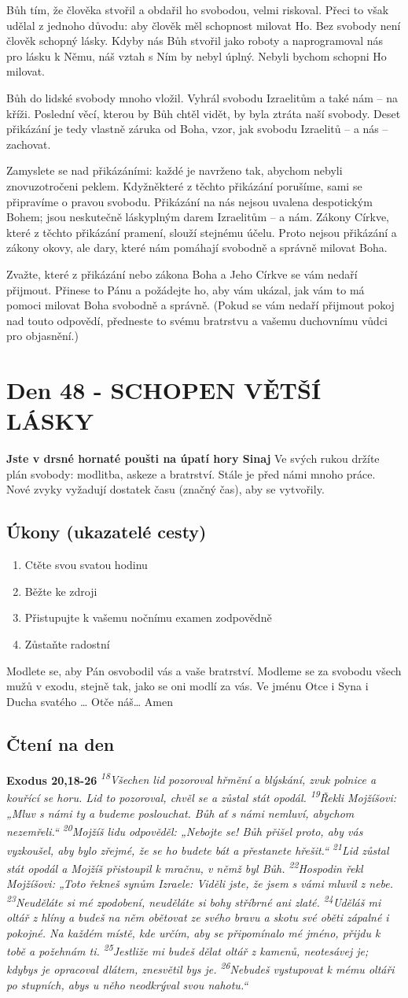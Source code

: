 \documentclass[11pt]{article}
\newcommand{\zacatekSedmyTyden}{
  \textbf{Jste v drsné hornaté poušti na úpatí hory Sinaj} \newline 
  Ve svých rukou držíte plán svobody: modlitba, askeze a bratrství. Stále je před námi mnoho práce. Nové zvyky vyžadují dostatek času (značný čas), aby se vytvořily.

  \subsection*{Úkony (ukazatelé cesty)}
\begin{enumerate}
  \item Ctěte svou svatou hodinu
  \item Běžte ke zdroji
  \item Přistupujte k vašemu nočnímu examen zodpovědně
  \item Zůstaňte radostní
\end{enumerate}
Modlete se, aby Pán osvobodil vás a vaše bratrství. \newline
Modleme se za svobodu všech mužů v exodu, stejně tak, jako se oni modlí za vás.\newline
Ve jménu Otce i Syna i Ducha svatého …  Otče náš… Amen
}
\begin{document}
Bůh tím, že člověka stvořil a obdařil ho svobodou, velmi riskoval. Přeci to však udělal z jednoho důvodu: aby
člověk měl schopnost milovat Ho. Bez svobody není člověk schopný lásky. Kdyby nás Bůh stvořil jako roboty
a naprogramoval nás pro lásku k Němu, náš vztah s Ním by nebyl úplný. Nebyli bychom schopni Ho milovat.

Bůh do lidské svobody mnoho vložil. Vyhrál svobodu Izraelitům a také nám – na kříži. Poslední věcí, kterou
by Bůh chtěl vidět, by byla ztráta naší svobody. Deset přikázání je tedy vlastně záruka od Boha, vzor, jak
svobodu Izraelitů – a nás – zachovat.

Zamyslete se nad přikázáními: každé je navrženo tak, abychom nebyli znovuzotročeni peklem. Kdyžněkteré
z těchto přikázání porušíme, sami se připravíme o pravou svobodu. Přikázání na nás nejsou uvalena
despotickým Bohem; jsou neskutečně láskyplným darem Izraelitům – a nám. Zákony Církve, které z těchto
přikázání pramení, slouží stejnému účelu. Proto nejsou přikázání a zákony okovy, ale dary, které nám pomáhají
svobodně a správně milovat Boha.

Zvažte, které z přikázání nebo zákona Boha a Jeho Církve se vám nedaří přijmout. Přinese to Pánu a požádejte
ho, aby vám ukázal, jak vám to má pomoci milovat Boha svobodně a správně. (Pokud se vám nedaří přijmout
pokoj nad touto odpovědí, předneste to svému bratrstvu a vašemu duchovnímu vůdci pro objasnění.)


\newpage
\section{Den 48 - SCHOPEN VĚTŠÍ LÁSKY }
\zacatekSedmyTyden
\subsection*{Čtení na den}
\textbf{Exodus 20,18-26}
\newline
\textit{
\textsuperscript{18}Všechen lid pozoroval hřmění a blýskání, zvuk polnice a kouřící se horu. Lid to pozoroval, chvěl se a zůstal stát opodál.
\textsuperscript{19}Řekli Mojžíšovi: „Mluv s námi ty a budeme poslouchat. Bůh ať s námi nemluví, abychom nezemřeli.“
\textsuperscript{20}Mojžíš lidu odpověděl: „Nebojte se! Bůh přišel proto, aby vás vyzkoušel, aby bylo zřejmé, že se ho budete bát a přestanete hřešit.“
\textsuperscript{21}Lid zůstal stát opodál a Mojžíš přistoupil k mračnu, v němž byl Bůh.
\textsuperscript{22}Hospodin řekl Mojžíšovi: „Toto řekneš synům Izraele: Viděli jste, že jsem s vámi mluvil z nebe.
\textsuperscript{23}Neuděláte si mé zpodobení, neuděláte si bohy stříbrné ani zlaté.
\textsuperscript{24}Uděláš mi oltář z hlíny a budeš na něm obětovat ze svého bravu a skotu své oběti zápalné i pokojné. Na každém místě, kde určím, aby se připomínalo mé jméno, přijdu k tobě a požehnám ti.
\textsuperscript{25}Jestliže mi budeš dělat oltář z kamenů, neotesávej je; kdybys je opracoval dlátem, znesvětil bys je.
\textsuperscript{26}Nebudeš vystupovat k mému oltáři po stupních, abys u něho neodkrýval svou nahotu.“
}
\end{document}
